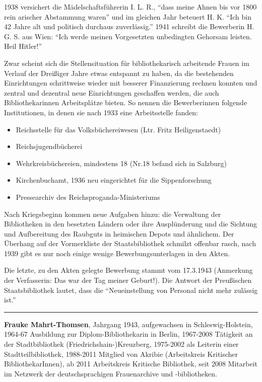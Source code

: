 \documentclass[a4paper,
fontsize=11pt,
oneside,
numbers=noperiodatend,
parskip=half-,
bibliography=totoc,
final
]{scrartcl}
\begin{document}
1938 versichert die Mädelschaftsführerin I. L. R., \enquote{dass meine
Ahnen bis vor 1800 rein arischer Abstammung waren} und im gleichen Jahr
beteuert H. K. \enquote{Ich bin 42 Jahre alt und politisch durchaus
zuverlässig.} 1941 schreibt die Bewerberin H. G. S. aus Wien:
\enquote{Ich werde meinen Vorgesetzten unbedingten Gehorsam leisten.
Heil Hitler!}

Zwar scheint sich die Stellensituation für bibliothekarisch arbeitende
Frauen im Verlauf der Dreißiger Jahre etwas entspannt zu haben, da die
bestehenden Einrichtungen schrittweise wieder mit besserer Finanzierung
rechnen konnten und zentral und dezentral neue Einrichtungen geschaffen
werden, die auch Bibliothekarinnen Arbeitsplätze bieten. So nennen die
Bewerberinnen folgende Institutionen, in denen sie nach 1933 eine
Arbeitsstelle fanden:

\begin{itemize}
\item
  Reichsstelle für das Volksbüchereiwesen (Ltr. Fritz Heiligenstaedt)
\item
  Reichsjugendbücherei
\item
  Wehrkreisbüchereien, mindestens 18 (Nr.18 befand sich in Salzburg)
\item
  Kirchenbuchamt, 1936 neu eingerichtet für die Sippenforschung
\item
  Pressearchiv des Reichsproganda-Ministeriums
\end{itemize}

Nach Kriegsbeginn kommen neue Aufgaben hinzu: die Verwaltung der
Bibliotheken in den besetzten Ländern oder ihre Ausplünderung und die
Sichtung und Aufbereitung des Raubguts in heimischen Depots und
ähnlichem. Der Überhang auf der Vormerkliste der Staatsbibliothek
schmilzt offenbar rasch, nach 1939 gibt es nur noch einige wenige
Bewerbungsunterlagen in den Akten.

Die letzte, zu den Akten gelegte Bewerbung stammt vom 17.3.1943
(Anmerkung der Verfasserin: Das war der Tag meiner Geburt!). Die Antwort
der Preußischen Staatsbibliothek lautet, dass die
\enquote{Neueinstellung von Personal nicht mehr zulässig ist.}

\begin{center}\rule{3in}{0.4pt}\end{center}

\textbf{Frauke Mahrt-Thomsen}, Jahrgang 1943, aufgewachsen in
Schleswig-Holstein, 1964-67 Ausbildung zur Diplom-Bibliothekarin in
Berlin, 1967-2008 Tätigkeit an der Stadtbibliothek
(Fried\-richs\-hain-)Kreuzberg, 1975-2002 als Leiterin einer
Stadtteilbibliothek, 1988-2011 Mitglied von Akribie (Arbeitskreis
Kritischer BibliothekarInnen), ab 2011 Arbeitskreis Kritische
Bibliothek, seit 2008 Mitarbeit im Netzwerk der deutschsprachigen
Frauenarchive und -bibliotheken.

\end{document}
